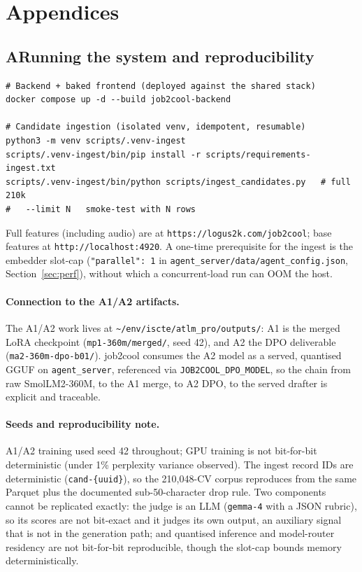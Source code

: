 \section*{Appendices}

\subsection*{A\quad Running the system and reproducibility}

\begin{verbatim}
# Backend + baked frontend (deployed against the shared stack)
docker compose up -d --build job2cool-backend

# Candidate ingestion (isolated venv, idempotent, resumable)
python3 -m venv scripts/.venv-ingest
scripts/.venv-ingest/bin/pip install -r scripts/requirements-ingest.txt
scripts/.venv-ingest/bin/python scripts/ingest_candidates.py   # full 210k
#   --limit N   smoke-test with N rows
\end{verbatim}

Full features (including audio) are at \verb|https://logus2k.com/job2cool|; base features at
\verb|http://localhost:4920|. A one-time prerequisite for the ingest is the embedder
slot-cap (\verb|"parallel": 1| in \verb|agent_server/data/agent_config.json|,
Section~\ref{sec:perf}), without which a concurrent-load run can OOM the host.

\paragraph{Connection to the A1/A2 artifacts.} The A1/A2 work lives at
\verb|~/env/iscte/atlm_pro/outputs/|: A1 is the merged LoRA checkpoint
(\verb|mp1-360m/merged/|, seed 42), and A2 the DPO deliverable (\verb|ma2-360m-dpo-b01/|).
job2cool consumes the A2 model as a served, quantised GGUF on \verb|agent_server|,
referenced via \verb|JOB2COOL_DPO_MODEL|, so the chain from raw SmolLM2-360M, to the A1
merge, to A2 DPO, to the served drafter is explicit and traceable.

\paragraph{Seeds and reproducibility note.} A1/A2 training used seed 42 throughout; GPU
training is not bit-for-bit deterministic (under 1\% perplexity variance observed). The
ingest record IDs are deterministic (\verb|cand-{uuid}|), so the 210,048-CV corpus
reproduces from the same Parquet plus the documented sub-50-character drop rule. Two
components cannot be replicated exactly: the judge is an LLM (\verb|gemma-4| with a JSON
rubric), so its scores are not bit-exact and it judges its own output, an auxiliary signal
that is not in the generation path; and quantised inference and model-router residency are
not bit-for-bit reproducible, though the slot-cap bounds memory deterministically.

